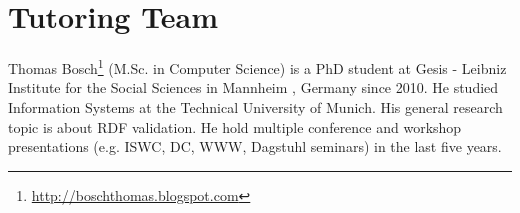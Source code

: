 \documentclass{llncs}
\begin{document}
\section{Tutoring Team}


Thomas Bosch\footnote{\url{http://boschthomas.blogspot.com}} (M.Sc. in Computer Science) is a PhD student at Gesis - Leibniz Institute for the Social Sciences in Mannheim , Germany since 2010.
He studied Information Systems at the Technical University of Munich.
His general research topic is about RDF validation. 
He hold multiple conference and workshop presentations (e.g. ISWC, DC, WWW, Dagstuhl seminars) in the last five years. 

{}

\setcounter{tocdepth}{1}
\end{document}
